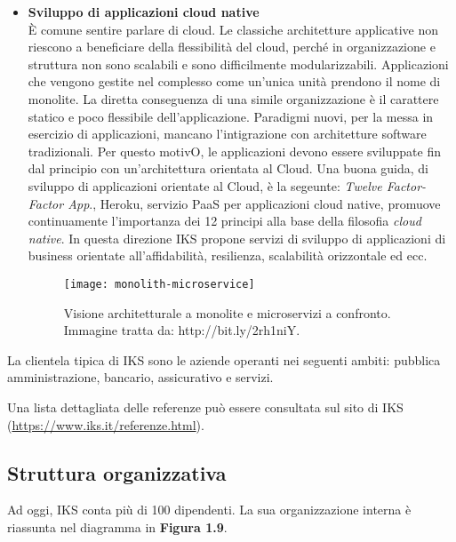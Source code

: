 \begin{itemize}
\begin{itemize}
		\item \textbf{Sviluppo di applicazioni cloud native}\\
		È comune sentire parlare di cloud. Le classiche 
        architetture applicative non riescono a beneficiare della 
		flessibilità del cloud, perché in organizzazione e struttura 
		non sono scalabili e sono difficilmente modularizzabili. Applicazioni
		che vengono gestite nel complesso come un'unica unità prendono il nome di 
		monolite. La diretta conseguenza di una simile organizzazione è 
		il carattere statico e poco flessibile dell'applicazione. Paradigmi nuovi, 
		per la messa in esercizio di applicazioni, mancano l'intigrazione 
		con architetture software tradizionali. Per questo motivO, 
		le applicazioni devono essere sviluppate fin dal principio con 
		un'architettura orientata al Cloud. Una buona guida, di sviluppo 
		di applicazioni orientate al Cloud, è la segeunte: \textit{Twelve Factor-Factor App}.,
		Heroku, servizio  PaaS per applicazioni cloud native, promuove 
		continuamente l'importanza dei 12 principi alla base della filosofia 
		\emph{cloud native}. In questa direzione IKS propone servizi di sviluppo 
		di applicazioni di business orientate all'affidabilità, resilienza, 
		scalabilità orizzontale ed ecc.
		
		\begin{figure}[htbp]
			\begin{center}		
			\texttt{[image: monolith-microservice]}
			\caption{Visione architetturale a monolite e 
				microservizi a confronto. 
				Immagine tratta da: http://bit.ly/2rh1niY.}
			\end{center}
			\end{figure}
			\end{itemize} 
		\end{itemize}

La clientela tipica di IKS sono le aziende operanti nei seguenti ambiti: 
pubblica amministrazione, bancario, assicurativo e servizi. 

Una lista dettagliata delle referenze può essere consultata sul sito
di IKS (\url{https://www.iks.it/referenze.html}).

\subsection{Struttura organizzativa}

Ad oggi, IKS conta più di 100 dipendenti. La sua organizzazione interna è 
riassunta nel diagramma in \textbf{Figura 1.9}.

